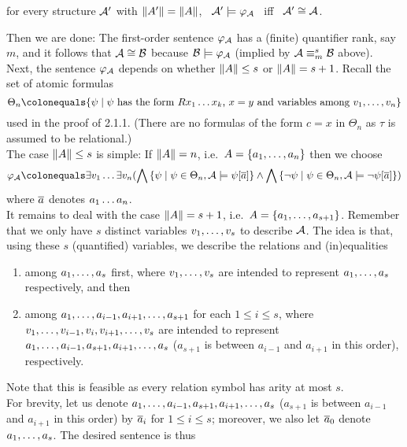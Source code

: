\begin{enumerate}[1.]
\begin{enumerate}[(a)]
\begin{center}
for every structure $\mathcal{A}'$ with $\|A'\| = \|A\|$, \ $\mathcal{A}' \models \varphi_{\mathcal{A}}$ \ iff \ $\strct{A}' \isom \strct{A}$.
\end{center}
Then we are done: The first-order sentence $\varphi_{\mathcal{A}}$ has a (finite) quantifier rank, say $m$, and it follows that $\strct{A} \isom \strct{B}$ because $\mathcal{B} \models \varphi_{\mathcal{A}}$ (implied by $\strct{A} \equv[s]_m \strct{B}$ above).
\medskip\\
Next, the sentence $\varphi_{\mathcal{A}}$ depends on whether $\|A\| \leq s$ or $\|A\| = s + 1$. Recall the set of atomic formulas
\[
\Theta_n \defas \sett{\psi}{\mathmode{\psi} has the form \mathmode{Rx_1 \etc x_k}, \mathmode{x = y} and variables among \mathmode{v_1, \etc, v_n}}
\]
used in the proof of 2.1.1. (There are no formulas of the form $c = x$ in $\Theta_n$ as $\tau$ is assumed to be relational.)
\medskip\\
The case $\|A\| \leq s$ is simple: If $\|A\| = n$, i.e.\ $A = {\{a_1, \ldots, a_n\}}$ then we choose
\[
\varphi_\strct{A} \defas \exists v_1 \etc \exists v_n (\bland\setm{\psi}{\psi \in \Theta_n, \strct{A} \satis \psi[\vect{a}]} \land \bland\setm{\neg\psi}{\psi \in \Theta_n, \strct{A} \satis \neg\psi[\vect{a}]})
\]
where $\overline{a}$ denotes $a_1 \ldots a_n$.
\medskip\\
It remains to deal with the case $\|A\| = s + 1$, i.e.\ $A = {\{a_1, \ldots, a_{s + 1}\}}$. Remember that we only have $s$ distinct variables $v_1, \ldots, v_s$ to describe $\mathcal{A}$. The idea is that, using these $s$ (quantified) variables, we describe the relations and (in)equalities
\begin{enumerate}[(1)]
\item among $a_1, \ldots, a_s$ first, where $v_1, \ldots, v_s$ are intended to represent $a_1, \ldots, a_s$ respectively, and then
\item among $a_1, \ldots, a_{i - 1}, a_{i + 1}, \ldots, a_{s + 1}$ for each $1 \leq i \leq s$, where $v_1, \ldots, v_{i - 1}, v_i, v_{i + 1}, \ldots, v_s$ are intended to represent $a_1, \ldots, a_{i - 1}, a_{s + 1}, a_{i + 1}, \ldots, a_s$ ($a_{s + 1}$ is between $a_{i - 1}$ and $a_{i + 1}$ in this order), respectively.
\end{enumerate}
Note that this is feasible as every relation symbol has arity at most $s$.
\medskip\\
For brevity, let us denote $a_1, \ldots, a_{i - 1}, a_{s + 1}, a_{i + 1}, \ldots, a_s$ ($a_{s + 1}$ is between $a_{i - 1}$ and $a_{i + 1}$ in this order) by $\overline{a}_i$ for $1 \leq i \leq s$; moreover, we also let $\overline{a}_0$ denote $a_1, \ldots, a_s$. The desired sentence is thus

\end{enumerate}
\end{enumerate}
